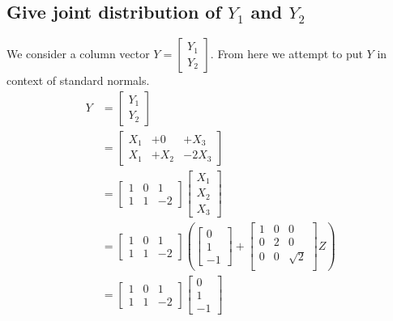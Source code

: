 \documentclass{article}
\begin{document}
\subsection{Give joint distribution of $Y_1$ and $Y_2$}
We consider a column vector $Y = \begin{bmatrix} Y_1 \\ Y_2 \end{bmatrix}$.
From here we attempt to put $Y$ in context of standard normals.
\begin{align*}
    Y &= \begin{bmatrix} Y_1 \\ Y_2 \end{bmatrix} \\
    &= \begin{bmatrix} X_1 & +0 & +X_3 \\ X_1 & +X_2 & -2X_3 \end{bmatrix} \\
    &= \begin{bmatrix} 1 & 0 & 1 \\ 1 & 1 & -2 \end{bmatrix}
    \begin{bmatrix} X_1 \\ X_2 \\ X_3 \end{bmatrix} \\
    &= \begin{bmatrix} 1 & 0 & 1 \\ 1 & 1 & -2 \end{bmatrix}
    \left(
        \begin{bmatrix}
            0 \\ 1 \\ -1
        \end{bmatrix}
        +
        \begin{bmatrix}
            1 & 0 & 0 \\
            0 & 2 & 0 \\
            0 & 0 & \sqrt{2} \\
        \end{bmatrix}
        Z
    \right) \\
    &= \begin{bmatrix} 1 & 0 & 1 \\ 1 & 1 & -2 \end{bmatrix}
    \begin{bmatrix}
        0 \\ 1 \\ -1
    \end{bmatrix}

\end{align*}
\end{document}
